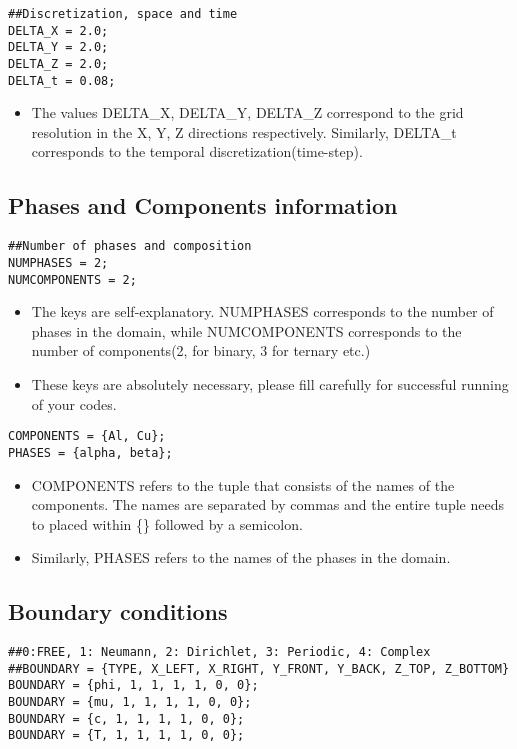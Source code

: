 \documentclass[a4paper,10pt]{article}
\begin{document}
\begin{lstlisting}
##Discretization, space and time
DELTA_X = 2.0;
DELTA_Y = 2.0;
DELTA_Z = 2.0;
DELTA_t = 0.08;
\end{lstlisting}

\begin{itemize}
 \item The values DELTA\_X, DELTA\_Y, DELTA\_Z correspond to the grid resolution in the X, Y, Z directions respectively. Similarly, DELTA\_t corresponds to the temporal discretization(time-step).
\end{itemize}

\subsection{Phases and Components information}

\begin{lstlisting}
##Number of phases and composition
NUMPHASES = 2;
NUMCOMPONENTS = 2;
\end{lstlisting}

\begin{itemize}
 \item The keys are self-explanatory. NUMPHASES corresponds to the number of phases in the domain, while NUMCOMPONENTS corresponds to the number of components(2, for binary, 3 for ternary etc.)
 \item These keys are absolutely necessary, please fill carefully for successful running of your codes.
\end{itemize}

\begin{lstlisting}
COMPONENTS = {Al, Cu};
PHASES = {alpha, beta};
\end{lstlisting}

\begin{itemize}
 \item COMPONENTS refers to the tuple that consists of the names of the components. The names are separated by commas and the entire tuple needs to placed within \{\} followed by a semicolon.
 \item Similarly, PHASES refers to the names of the phases in the domain.
\end{itemize}

\subsection{Boundary conditions}

\begin{lstlisting}
##0:FREE, 1: Neumann, 2: Dirichlet, 3: Periodic, 4: Complex
##BOUNDARY = {TYPE, X_LEFT, X_RIGHT, Y_FRONT, Y_BACK, Z_TOP, Z_BOTTOM}
BOUNDARY = {phi, 1, 1, 1, 1, 0, 0};
BOUNDARY = {mu, 1, 1, 1, 1, 0, 0};
BOUNDARY = {c, 1, 1, 1, 1, 0, 0};
BOUNDARY = {T, 1, 1, 1, 1, 0, 0};
\end{lstlisting}
\end{document}
